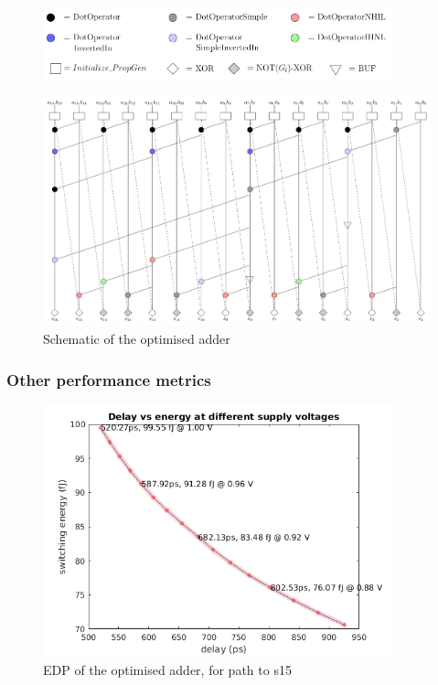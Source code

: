 \documentclass[english]{article}
\begin{document}
\begin{figure}[H]
\begin{centering}
\includegraphics[width=0.9\textwidth, height=0.1\paperheight]{figures/adderLegend}
\par\end{centering}
\label{adderLegend}
\end{figure}

\begin{figure}[H]
\begin{centering}
\includegraphics[angle=90,height=0.60\paperheight]{figures/adderStructure}
\par\end{centering}
\caption{Schematic of the optimised adder}
\label{adderSchematic}
\end{figure}

\subsubsection{Other performance metrics}
\begin{figure}[H]
\begin{centering}
\includegraphics[width=0.9\textwidth]{figures/EDPlabeled.png}
\par\end{centering}
\caption{EDP of the optimised adder, for path to s15}
\label{adderEDP}
\end{figure}
\end{document}
